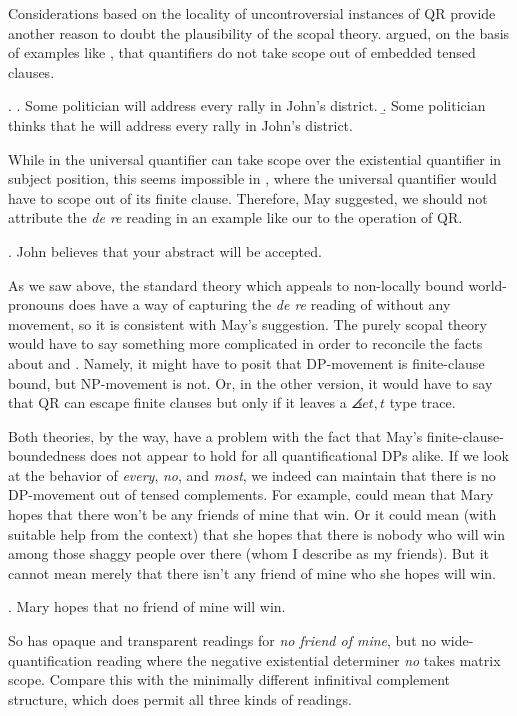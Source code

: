 Considerations based on the locality of uncontroversial instances of QR provide another reason to doubt the plausibility of the scopal theory. \citet{may:diss} argued, on the basis of examples like \Next, that quantifiers do not take scope out of embedded tensed clauses.

\ex. \a. Some politician will address every rally in John's district. 
\b. Some politician thinks that he will address every rally in John's district.

While in \Last[a] the universal quantifier can take scope over the existential quantifier in subject position, this seems impossible in \Last[b], where the universal quantifier would have to scope out of its finite clause. Therefore, May suggested, we should not attribute the \emph{de re} reading in an example like our \Next to the operation of QR.

\ex. John believes that your abstract will be accepted.

As we saw above, the standard theory which appeals to non-locally bound world-pronouns does have a way of capturing the \emph{de re} reading of \Last without any movement, so it is consistent with May's suggestion. The purely scopal theory would have to say something more complicated in order to reconcile the facts about \LLast and \Last. Namely, it might have to posit that DP-movement is finite-clause bound, but NP-movement is not. Or, in the other version, it would have to say that QR can escape finite clauses but only if it leaves a $\angles{et,t}$ type trace.

Both theories, by the way, have a problem with the fact that May's finite-clause-boundedness does not appear to hold for all quantificational DPs alike. If we look at the behavior of \emph{every}, \emph{no}, and \emph{most}, we indeed can maintain that there is no DP-movement out of tensed complements. For example, \Next could mean that Mary hopes that there won't be any friends of mine that win. Or it could mean (with suitable help from the context) that she hopes that there is nobody who will win among those shaggy people over there (whom I describe as my friends). But it cannot mean merely that there isn't any friend of mine who she hopes will win.

\ex. Mary hopes that no friend of mine will win.

So \Next has opaque and transparent readings for \emph{no friend of mine}, but no wide-quantification reading where the negative existential determiner \emph{no} takes matrix scope. Compare this with the minimally different infinitival complement structure, which does permit all three kinds of readings.

